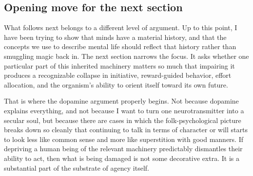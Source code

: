 \subsection{Opening move for the next section}\label{03_it_started-opening-move-for-the-next-section}

What follows next belongs to a different level of argument. Up to this point, I have been trying to show that minds have a material history, and that the concepts we use to describe mental life should reflect that history rather than smuggling magic back in. The next section narrows the focus. It asks whether one particular part of this inherited machinery matters so much that impairing it produces a recognizable collapse in initiative, reward-guided behavior, effort allocation, and the organism's ability to orient itself toward its own future.

That is where the dopamine argument properly begins. Not because dopamine explains everything, and not because I want to turn one neurotransmitter into a secular soul, but because there are cases in which the folk-psychological picture breaks down so cleanly that continuing to talk in terms of character or will starts to look less like common sense and more like superstition with good manners. If depriving a human being of the relevant machinery predictably dismantles their ability to act, then what is being damaged is not some decorative extra. It is a substantial part of the substrate of agency itself.
